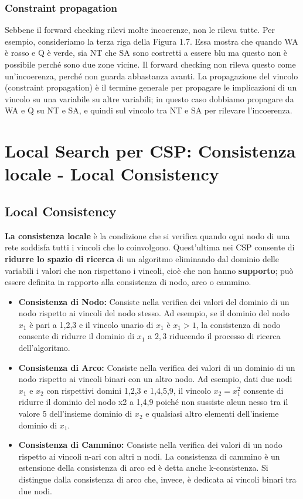 \subsection{Constraint propagation}
Sebbene il forward checking rilevi molte incoerenze, non le rileva tutte. Per esempio, consideriamo la terza riga della Figura 1.7. Essa mostra che quando WA è rosso e Q è verde, sia NT che SA sono costretti a essere blu ma questo non è possibile perché sono due zone vicine. Il forward checking non rileva questo come un'incoerenza, perché non guarda abbastanza avanti. La propagazione del vincolo (constraint propagation) è il termine generale per propagare le implicazioni di un vincolo su una variabile su altre variabili; in questo caso dobbiamo propagare da WA e Q su NT e SA, e quindi sul vincolo tra NT e SA per rilevare l'incoerenza.

\chapter{Local Search per CSP: Consistenza locale - Local Consistency} \label{ch:Local Search per Crisp CSP: Consistenza locale}
\section{Local Consistency}
\textbf{La consistenza locale} è la condizione che si verifica quando ogni nodo di una rete soddisfa tutti i vincoli che lo coinvolgono. Quest'ultima nei CSP consente di \textbf{ridurre lo spazio di ricerca} di un algoritmo eliminando dal dominio delle variabili i valori che non rispettano i vincoli, cioè che non hanno \textbf{supporto}; può essere definita in rapporto alla consistenza di nodo, arco o cammino.
\begin{itemize}
    \item \textbf{Consistenza di Nodo:} Consiste nella verifica dei valori del dominio di un nodo rispetto ai vincoli del nodo stesso. Ad esempio, se il dominio del nodo $x_1$ è pari a 1,2,3 e il vincolo unario di $x_1$ è $x_1 > 1$, la consistenza di nodo consente di ridurre il dominio di $x_1$ a $2,3$ riducendo il processo di ricerca dell'algoritmo.
    \item \textbf{Consistenza di Arco:} Consiste nella verifica dei valori di un dominio di un nodo rispetto ai vincoli binari con un altro nodo. Ad esempio, dati due nodi $x_1$ e $x_2$ con rispettivi domini 1,2,3 e 1,4,5,9, il vincolo $x_2 = x_{1}^2$ consente di ridurre il dominio del nodo x2 a 1,4,9 poiché non sussiste alcun nesso tra il valore 5 dell'insieme dominio di $x_2$ e qualsiasi altro elementi dell'insieme dominio di $x_1$.
    \item \textbf{Consistenza di Cammino:} Consiste nella verifica dei valori di un nodo rispetto ai vincoli n-ari con altri n nodi. La consistenza di cammino è un estensione della consistenza di arco ed è detta anche k-consistenza. Si distingue dalla consistenza di arco che, invece, è dedicata ai vincoli binari tra due nodi.
\end{itemize}

